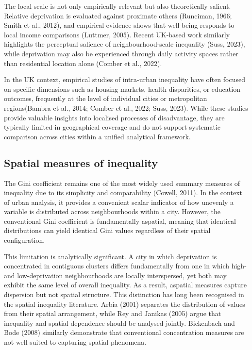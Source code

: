 The local scale is not only empirically relevant but also theoretically salient. Relative deprivation is evaluated against proximate others (Runciman, 1966; Smith et al., 2012), and empirical evidence shows that well-being responds to local income comparisons (Luttmer, 2005). Recent UK-based work similarly highlights the perceptual salience of neighbourhood-scale inequality (Suss, 2023), while deprivation may also be experienced through daily activity spaces rather than residential location alone (Comber et al., 2022).

In the UK context, empirical studies of intra-urban inequality have often focused on specific dimensions such as housing markets, health disparities, or education outcomes, frequently at the level of individual cities or metropolitan regions(Bambra et al., 2014; Comber et al., 2022; Suss, 2023). While these studies provide valuable insights into localised processes of disadvantage, they are typically limited in geographical coverage and do not support systematic comparison across cities within a unified analytical framework.

\subsection{Spatial measures of inequality}

The Gini coefficient remains one of the most widely used summary measures of inequality due to its simplicity and comparability (Cowell, 2011). In the context of urban analysis, it provides a convenient scalar indicator of how unevenly a variable is distributed across neighbourhoods within a city. However, the conventional Gini coefficient is fundamentally aspatial, meaning that identical distributions can yield identical Gini values regardless of their spatial configuration.

This limitation is analytically significant. A city in which deprivation is concentrated in contiguous clusters differs fundamentally from one in which high- and low-deprivation neighbourhoods are locally interspersed, yet both may exhibit the same level of overall inequality. As a result, aspatial measures capture dispersion but not spatial structure. This distinction has long been recognised in the spatial inequality literature. Arbia (2001) separates the distribution of values from their spatial arrangement, while Rey and Janikas (2005) argue that inequality and spatial dependence should be analysed jointly. Bickenbach and Bode (2008) similarly demonstrate that conventional concentration measures are not well suited to capturing spatial phenomena.

